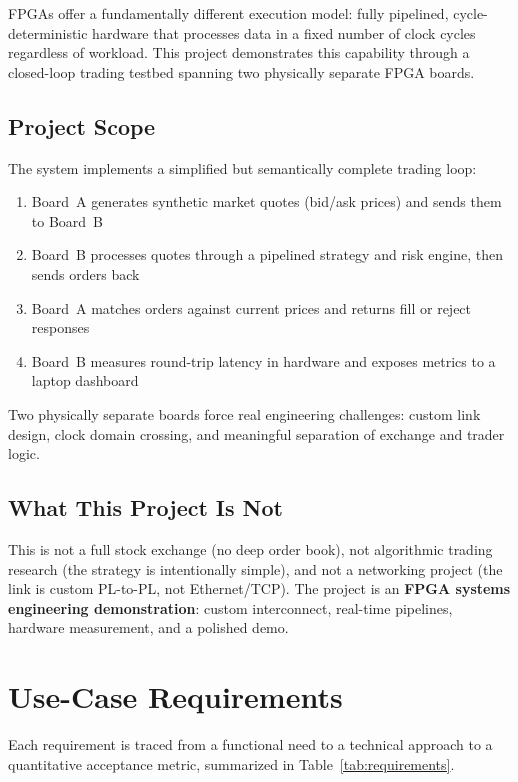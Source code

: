\documentclass[conference]{IEEEtran}
\begin{document}
FPGAs offer a fundamentally different execution model: fully pipelined, cycle-deterministic hardware that processes data in a fixed number of clock cycles regardless of workload. This project demonstrates this capability through a closed-loop trading testbed spanning two physically separate FPGA boards.

\subsection{Project Scope}

The system implements a simplified but semantically complete trading loop:
\begin{enumerate}[noitemsep]
  \item Board~A generates synthetic market quotes (bid/ask prices) and sends them to Board~B
  \item Board~B processes quotes through a pipelined strategy and risk engine, then sends orders back
  \item Board~A matches orders against current prices and returns fill or reject responses
  \item Board~B measures round-trip latency in hardware and exposes metrics to a laptop dashboard
\end{enumerate}

Two physically separate boards force real engineering challenges: custom link design, clock domain crossing, and meaningful separation of exchange and trader logic.

\subsection{What This Project Is Not}

This is not a full stock exchange (no deep order book), not algorithmic trading research (the strategy is intentionally simple), and not a networking project (the link is custom PL-to-PL, not Ethernet/TCP). The project is an \textbf{FPGA systems engineering demonstration}: custom interconnect, real-time pipelines, hardware measurement, and a polished demo.

\section{Use-Case Requirements}

Each requirement is traced from a functional need to a technical approach to a quantitative acceptance metric, summarized in Table~\ref{tab:requirements}.
\end{document}
